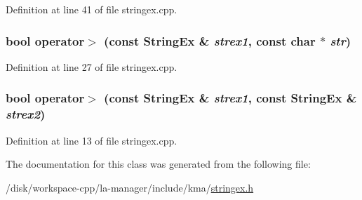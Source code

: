 Definition at line 41 of file stringex.cpp.\hypertarget{classStringEx_50626126af7fa40dffff0b4011023fce}{
\subsubsection[{operator$>$}]{\setlength{\rightskip}{0pt plus 5cm}bool operator$>$ (const {\bf StringEx} \& {\em strex1}, \/  const char $\ast$ {\em str})}}
\label{classStringEx_50626126af7fa40dffff0b4011023fce}




Definition at line 27 of file stringex.cpp.\hypertarget{classStringEx_0352cabe898a856bb669a52b291f2b0c}{
\subsubsection[{operator$>$}]{\setlength{\rightskip}{0pt plus 5cm}bool operator$>$ (const {\bf StringEx} \& {\em strex1}, \/  const {\bf StringEx} \& {\em strex2})}}
\label{classStringEx_0352cabe898a856bb669a52b291f2b0c}




Definition at line 13 of file stringex.cpp.

The documentation for this class was generated from the following file:\begin{CompactItemize}
\item 
/disk/workspace-cpp/la-manager/include/kma/\hyperlink{stringex_8h}{stringex.h}\end{CompactItemize}

